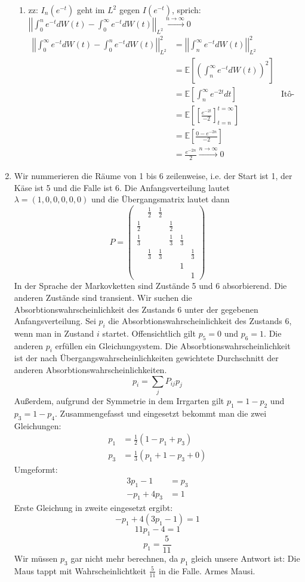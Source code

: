 \documentclass[a4paper,11pt,notitlepage,fullpage]{article}
\newcommand{\Ee}[1]{\mathbb E\left[#1\right]}
\newcommand{\norm}[2]{\left|\left|{#1}\right|\right|_{#2}}
\begin{document}
\begin{enumerate}
\begin{enumerate}
\item zz: $I_n (e^{-t})$ geht im $L^2$ gegen $I(e^{-t})$, sprich: $ \norm{\int_0^n e^{-t} dW(t) - \int_0^\infty e^{-t} dW(t)}{L^2} \stackrel{n\rightarrow\infty}{\rightarrow} 0$
\begin{align*}
\norm{\int_0^\infty e^{-t} dW(t) - \int_0^n e^{-t} dW(t)}{L^2}^2 &= \norm{\int_n^\infty e^{-t} dW(t)}{L^2}^2\\
&= \Ee{\left(\int_n^\infty e^{-t} dW(t)\right)^2}\\
&= \Ee{\int_n^\infty e^{-2t} dt} &\text{Itô-Iso}\\
&= \Ee{\left[ \frac{e^{-2t}}{-2} \right]_{t=n}^{t=\infty}}\\
&= \Ee{ \frac{0 - e^{-2n}}{-2}}\\
&= \frac{e^{-2n}}{2} \stackrel{n\rightarrow\infty}{\rightarrow} 0
\end{align*}
\end{enumerate}

\item Wir nummerieren die Räume von 1 bis 6 zeilenweise, i.e. der Start ist 1, der Käse ist 5 und die Falle ist 6. Die Anfangsverteilung lautet $\lambda = (1,0,0,0,0,0)$ und die Übergangsmatrix lautet dann
$$P = \begin{pmatrix}
&\frac{1}{2}&\frac{1}{2}&&& \\
\frac{1}{2}&&&\frac{1}{2}&& \\
\frac{1}{3}&&&\frac{1}{3}&\frac{1}{3}& \\
&\frac{1}{3}&\frac{1}{3}&&&\frac{1}{3} \\
&&&&1& \\
&&&&&1 
\end{pmatrix}$$
In der Sprache der Markovketten sind Zustände 5 und 6 absorbierend. Die anderen Zustände sind transient. Wir suchen die Absorbtionswahrscheinlichkeit des Zustands 6 unter der gegebenen Anfangsverteilung.
Sei $p_i$ die Absorbtionswahrscheinlichkeit des Zustands 6, wenn man in Zustand $i$ startet. Offensichtlich gilt $p_5 = 0$ und $p_6 = 1$. Die anderen $p_i$ erfüllen ein Gleichungsystem. Die Absorbtionswahrscheinlichkeit ist der nach Übergangswahrscheinlichkeiten gewichtete Durchschnitt der anderen Absorbtionswahrscheinlichkeiten.
$$p_i = \sum_j P_{ij} p_j$$
Außerdem, aufgrund der Symmetrie in dem Irrgarten gilt $p_1 = 1 - p_2$ und $p_3 = 1-p_4$. Zusammengefasst und eingesetzt bekommt man die zwei Gleichungen:
\begin{align*}
p_1 &= \frac{1}{2}(1 - p_1 + p_3) \\
p_3 &= \frac{1}{3}(p_1 + 1 - p_3 + 0)
\end{align*}
Umgeformt:
\begin{align*}
3 p_1 - 1&= p_3 \\
- p_1 + 4 p_3 &= 1
\end{align*}
Erste Gleichung in zweite eingesetzt ergibt:
$$- p_1 + 4 (3 p_1 - 1) = 1$$
$$11 p_1 - 4 = 1$$
$$p_1 = \frac{5}{11}$$
Wir müssen $p_3$ gar nicht mehr berechnen, da $p_1$ gleich unsere Antwort ist: Die Maus tappt mit Wahrscheinlichtkeit $\frac{5}{11}$ in die Falle. Armes Mausi.


\end{enumerate}
\end{document}
